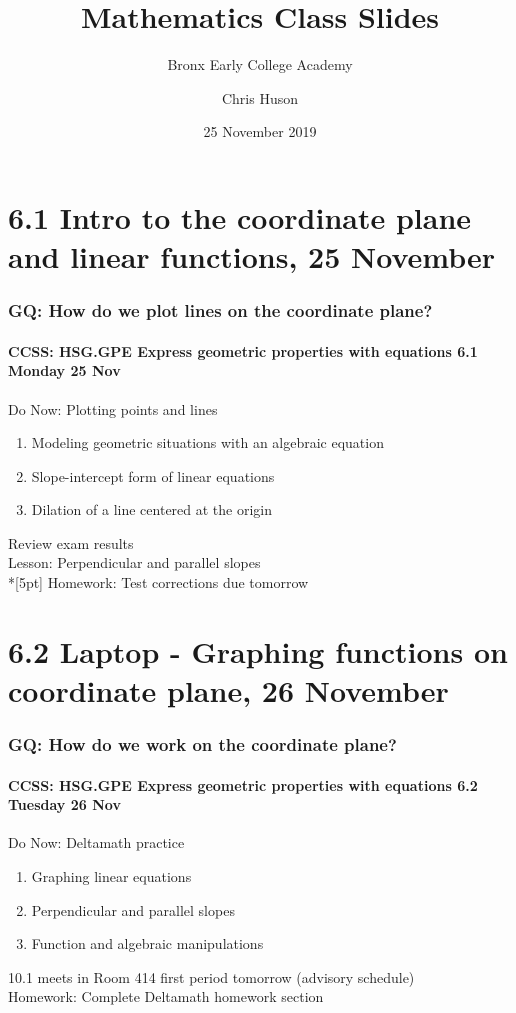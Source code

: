 \documentclass{beamer}
\title{Mathematics Class Slides}
\subtitle{Bronx Early College Academy}
\author{Chris Huson}
\date{25 November 2019}
\begin{document}
\frame{\titlepage}
\section[Outline]{}
\frame{\tableofcontents}

\section{6.1 Intro to the coordinate plane and linear functions, 25 November}
  \frame
  {
    \frametitle{GQ: How do we plot lines on the coordinate plane?}
    \framesubtitle{CCSS: HSG.GPE Express geometric properties with equations \hfill \alert{6.1 Monday 25 Nov}}

    \begin{block}{Do Now: Plotting points and lines}
    \begin{enumerate}
      \item Modeling geometric situations with an algebraic equation
      \item Slope-intercept form of linear equations
      \item Dilation of a line centered at the origin
    \end{enumerate}
    \end{block}
    Review exam results \\
    Lesson: Perpendicular and parallel slopes \\*[5pt]
    Homework: Test corrections due \alert{tomorrow}
  }

\section{6.2 Laptop - Graphing functions on coordinate plane, 26 November}
\frame
{
\frametitle{GQ: How do we work on the coordinate plane?}
\framesubtitle{CCSS: HSG.GPE Express geometric properties with equations \hfill \alert{6.2 Tuesday 26 Nov}}

\begin{block}{Do Now: Deltamath practice}
\begin{enumerate}
  \item Graphing linear equations
  \item Perpendicular and parallel slopes
  \item Function and algebraic manipulations
\end{enumerate}
\end{block}
10.1 meets in Room 414 first period tomorrow (advisory schedule)\\[0.5cm]
Homework: Complete Deltamath homework section
}
\end{document}
